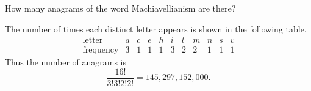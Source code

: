 \documentclass[addpoints,12pt]{exam}
\begin{document}
\begin{questions}
\question[16] How many anagrams of the word
{\textsf{Machiavellianism}} are there?
\begin{solution}%
The number of times each distinct letter appears is
shown in the following table.
\[\begin{array}{r|cccccccccc}
\text{letter}&a&c&e&h&i&l&m&n&s&v\\\hline
\text{frequency}&3&1&1&1&3&2&2&1&1&1
\end{array}\]
Thus the number of anagrams is
\[\frac{16!}{3!3!2!2!}=145,297,152,000.\]
\end{solution}

\vfill
\begin{center}\gradetable[h][questions]\end{center}

\end{questions}
\end{document}
